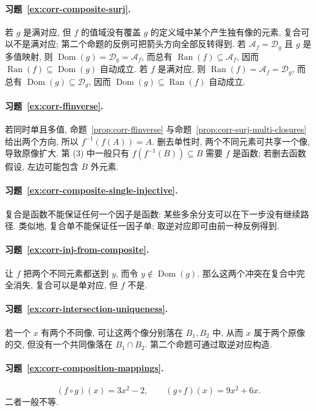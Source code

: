 \documentclass[usesamecnt, thmcnt=section, lang=cn, newtx, 10pt, scheme=chinese]{elegantbook}
\begin{document}
\paragraph*{习题~\ref{ex:corr-composite-surj}.}
若 $g$ 是满对应, 但 $f$ 的值域没有覆盖 $g$ 的定义域中某个产生独有像的元素, 复合可以不是满对应; 第二个命题的反例可把箭头方向全部反转得到. 若 $\mathscr A_f=\mathscr D_g$ 且 $g$ 是多值映射, 则 $\operatorname{Dom}(g)=\mathscr D_g=\mathscr A_f$, 而总有 $\operatorname{Ran}(f)\subseteq\mathscr A_f$, 因而 $\operatorname{Ran}(f)\subseteq\operatorname{Dom}(g)$ 自动成立. 若 $f$ 是满对应, 则 $\operatorname{Ran}(f)=\mathscr A_f=\mathscr D_g$, 而总有 $\operatorname{Dom}(g)\subseteq\mathscr D_g$, 因而 $\operatorname{Dom}(g)\subseteq\operatorname{Ran}(f)$ 自动成立.


\paragraph*{习题~\ref{ex:corr-ffinverse}.}
若同时单且多值, 命题~\ref{prop:corr-ffinverse} 与命题~\ref{prop:corr-surj-multi-closures} 给出两个方向, 所以 $f^{-1}(f(A))=A$. 删去单性时, 两个不同元素可共享一个像, 导致原像扩大. 第 (3) 中一般只有 $f(f^{-1}(B))\subseteq B$ 需要 $f$ 是函数; 若删去函数假设, 左边可能包含 $B$ 外元素.

\paragraph*{习题~\ref{ex:corr-composite-single-injective}.}
复合是函数不能保证任何一个因子是函数: 某些多余分支可以在下一步没有继续路径. 类似地, 复合单不能保证任一因子单; 取逆对应即可由前一种反例得到.

\paragraph*{习题~\ref{ex:corr-inj-from-composite}.}
让 $f$ 把两个不同元素都送到 $y$, 而令 $y\notin\operatorname{Dom}(g)$. 那么这两个冲突在复合中完全消失, 复合可以是单对应, 但 $f$ 不是.

\paragraph*{习题~\ref{ex:corr-intersection-uniqueness}.}
若一个 $x$ 有两个不同像, 可让这两个像分别落在 $B_1,B_2$ 中, 从而 $x$ 属于两个原像的交, 但没有一个共同像落在 $B_1\cap B_2$. 第二个命题可通过取逆对应构造.


\paragraph*{习题~\ref{ex:corr-composition-mappings}.}
\[
 (f\circ g)(x)=3x^2-2,
 \qquad
 (g\circ f)(x)=9x^2+6x.
\]
二者一般不等.
\end{document}
